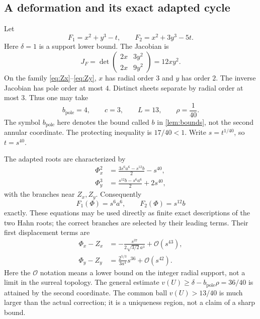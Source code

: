 \documentclass[11pt,letterpaper]{article}
\theoremstyle{definition}
\theoremstyle{remark}
\newcommand{\smallO}{\mathcal O}
\numberwithin{equation}{section}
\begin{document}
\subsection{A deformation and its exact adapted cycle}
Let
\begin{equation}\label{eq:exampleF}
 F_1=x^2+y^3-t,\qquad F_2=x^2+3y^3-5t.
\end{equation}
Here $\delta=1$ is a support lower bound. The Jacobian is
\begin{equation}\label{eq:exampleJ}
 J_F=\det\begin{pmatrix}2x&3y^2\\2x&9y^2\end{pmatrix}=12xy^2.
\end{equation}
On the family \eqref{eq:Zx}--\eqref{eq:Zy}, $x$ has radial order $3$
and $y$ has order $2$. The inverse Jacobian has pole order at most $4$.
Distinct sheets separate by radial order at most $3$. Thus one may take
\[
 b_{\mathrm{pole}}=4,\qquad c=3,\qquad L=13,\qquad \rho=\frac1{40}.
\]
The symbol $b_{\mathrm{pole}}$ here denotes the bound called $b$ in
\cref{lem:bounds}, not the second annular coordinate. The protecting inequality
is $17/40<1$. Write $s=t^{1/40}$, so $t=s^{40}$.

The adapted roots are characterized by
\begin{align}
 \Phi_x^2&=\frac{3s^6a^6-s^{12}b}{2}-s^{40},\label{eq:Phix}\\
 \Phi_y^3&=\frac{s^{12}b-s^6a^6}{2}+2s^{40},\label{eq:Phiy}
\end{align}
with the branches near $Z_x,Z_y$. Consequently
\[
 F_1(\Phi)=s^6a^6,\qquad F_2(\Phi)=s^{12}b
\]
exactly. These equations may be used directly as finite exact descriptions of
the two Hahn roots; the correct branches are selected by their leading terms.
Their first displacement terms are
\begin{align}
 \Phi_x-Z_x
 &=-\frac{s^{37}}{2\sqrt{3/2}\,a^3}+\smallO(s^{43}),\label{eq:dx}\\
 \Phi_y-Z_y
 &=\frac{2^{5/3}}{3a^4}s^{36}+\smallO(s^{42}).\label{eq:dy}
\end{align}
Here the $\smallO$ notation means a lower bound on the integer radial
support, not a limit in the surreal topology. The general estimate
$v(U)\geq\delta-b_{\mathrm{pole}}\rho=36/40$ is attained by the second
coordinate. The common ball $v(U)>13/40$ is much larger than the actual
correction; it is a uniqueness region, not a claim of a sharp bound.
\end{document}
